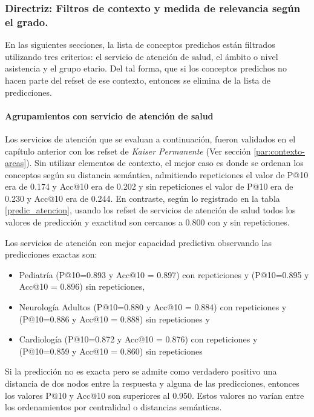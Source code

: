 \subsubsection{Directriz: Filtros de contexto y medida de relevancia según el grado.}

En las siguientes secciones, la lista de conceptos predichos están filtrados utilizando tres criterios: el servicio de atención de salud, el ámbito o nivel asistencia y el grupo etario. Del tal forma, que si los conceptos predichos no hacen parte del {\acrshort{refset}} de ese contexto, entonces se elimina de la lista de predicciones.

\paragraph{Agrupamientos con servicio de atención de salud}

Los servicios de atención que se evaluan a continuación, fueron validados en el capítulo anterior con los {\acrshort{refset}} de \textit{Kaiser Permanente} (Ver sección \ref{par:contexto-areas}). Sin utilizar elementos de contexto, el mejor caso es donde se ordenan los conceptos según su distancia semántica, admitiendo repeticiones el valor de P@10 era de \num{0.174} y Acc@10 era de \num{0.202} y sin repeticiones el valor de P@10 era de \num{0.230} y Acc@10 era de \num{0.244}. En contraste, según lo registrado en la tabla \ref{predic_atencion}, usando los {\acrshort{refset}} de servicios de atención de salud todos los valores de predicción y exactitud son cercanos a \num{0.800} con y sin repeticiones.

Los servicios de atención con mejor capacidad predictiva observando las predicciones exactas son:

\begin{itemize}
\item Pediatría (P@10=\num{0.893} y Acc@10 = \num{0.897}) con repeticiones y (P@10=\num{0.895} y Acc@10 = \num{0.896}) sin repeticiones,
\item Neurología Adultos (P@10=\num{0.880} y Acc@10 = \num{0.884}) con repeticiones y (P@10=\num{0.886} y Acc@10 = \num{0.888}) sin repeticiones y 
\item Cardiología (P@10=\num{0.872} y Acc@10 = \num{0.876}) con repeticiones y (P@10=\num{0.859} y Acc@10 = \num{0.860}) sin repeticiones
\end{itemize}

Si la predicción no es exacta pero se admite como verdadero positivo una distancia de dos nodos entre la respuesta y alguna de las predicciones, entonces los valores P@10 y Acc@10 son superiores al \num{0.950}. Estos valores no varían entre los ordenamientos por centralidad o distancias semánticas.


